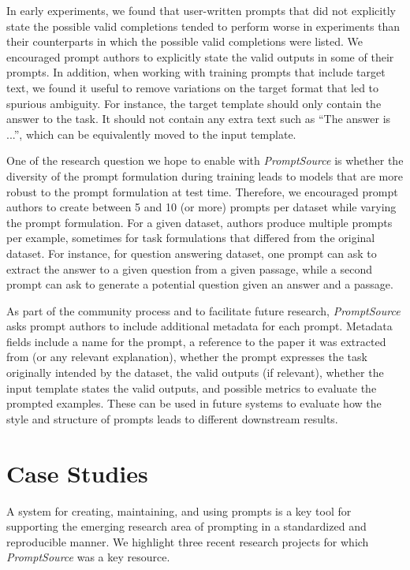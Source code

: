 In early experiments, we found that user-written prompts that did not explicitly state the possible valid completions tended to perform worse in experiments than their counterparts in which the possible valid completions were listed. We encouraged prompt authors to explicitly state the valid outputs in some of their prompts. In addition, when working with training prompts that include target text, we found it useful to remove variations on the target format that led to spurious ambiguity. For instance, the target template should only contain the answer to the task. It should not contain any extra text such as ``The answer is ...'', which can be equivalently moved to the input template.

One of the research question we hope to enable with \textit{PromptSource} is whether the diversity of the prompt formulation during training leads to models that are more robust to the prompt formulation at test time. Therefore, we encouraged prompt authors to create between 5 and 10 (or more) prompts per dataset while varying the prompt formulation. For a given dataset, authors produce multiple prompts per example, sometimes for task formulations that differed from the original dataset. For instance, for question answering dataset, one prompt can ask to extract the answer to a given question from a given passage, while a second prompt can ask to generate a potential question given an answer and a passage. 

As part of the community process and to facilitate future research, \textit{PromptSource} asks prompt authors to include additional metadata for each prompt. Metadata fields include a name for the prompt, a reference to the paper it was extracted from (or any relevant explanation), whether the prompt expresses the task originally intended by the dataset, the valid outputs (if relevant), whether the input template states the valid outputs, and possible metrics to evaluate the prompted examples. These can be used in future systems to evaluate how the style and structure of prompts leads to different downstream results.

\section{Case Studies} \label{sec:case-studies}

A system for creating, maintaining, and using prompts is a key tool for supporting the emerging research area of prompting in a standardized and reproducible manner. We highlight three recent research projects for which \textit{PromptSource} was a key resource.

